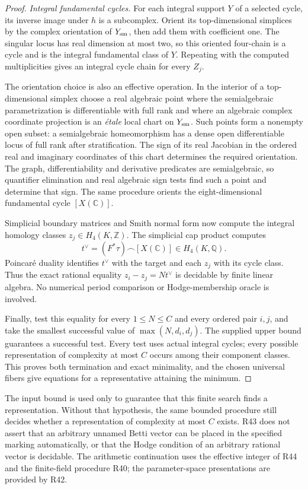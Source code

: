 \begin{proof}
\emph{Integral fundamental cycles.}
For each integral support $Y$ of a selected cycle, its inverse image
under $h$ is a subcomplex. Orient its top-dimensional simplices by
the complex orientation of $Y_{\rm sm}$, then add them with coefficient
one. The singular locus has real dimension at most two, so this
oriented four-chain is a cycle and is the integral fundamental class
of $Y$. Repeating with the computed multiplicities gives an integral
cycle chain for every $Z_j$.

The orientation choice is also an effective operation. In the interior
of a top-dimensional simplex choose a real algebraic point where the
semialgebraic parametrization is differentiable with full rank and
where an algebraic complex coordinate projection is an \emph{\'etale}
local chart on $Y_{\rm sm}$. Such points form a nonempty open subset:
a semialgebraic homeomorphism has a dense open differentiable locus
of full rank after stratification. The sign of its real Jacobian in
the ordered real and imaginary coordinates of this chart determines
the required orientation. The graph, differentiability and derivative
predicates are semialgebraic, so quantifier elimination and real
algebraic sign tests find such a point and determine that sign.
The same procedure orients the eight-dimensional fundamental cycle
$[X(\mathbb C)]$.

Simplicial boundary matrices and Smith normal form now compute the
integral homology classes $z_j\in H_4(K,\mathbb Z)$. The simplicial
cap product computes
\[
        t^\vee=(F^*\tau)\mathbin{\frown}[X(\mathbb C)]
                    \in H_4(K,\mathbb Q).
\]
Poincar\'e duality identifies $t^\vee$ with the target and each $z_j$
with its cycle class. Thus the exact rational equality
$z_i-z_j=Nt^\vee$ is decidable by finite linear algebra. No numerical
period comparison or Hodge-membership oracle is involved.

Finally, test this equality for every $1\leq N\leq C$ and every
ordered pair $i,j$, and take the smallest successful value of
$\max(N,d_i,d_j)$. The supplied upper bound guarantees a successful
test. Every test uses actual integral cycles; every possible
representation of complexity at most $C$ occurs among their component
classes. This proves both termination and exact minimality, and the
chosen universal fibers give equations for a representative attaining
the minimum.
\end{proof}

The input bound is used only to guarantee that this finite search
finds a representation. Without that hypothesis, the same bounded
procedure still decides whether a representation of complexity at
most $C$ exists. R43 does not assert that an arbitrary unnamed Betti
vector can be placed in the specified marking automatically, or that
the Hodge condition of an arbitrary rational vector is decidable.
The arithmetic continuation uses the effective integer of R44 and
the finite-field procedure R40; the parameter-space presentations are
provided by R42.
